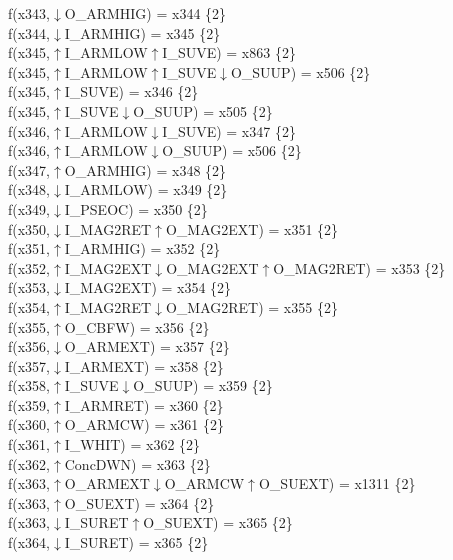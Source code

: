f(x343,$\downarrow$O\_ARMHIG) = x344 \{2\} \\  
f(x344,$\downarrow$I\_ARMHIG) = x345 \{2\} \\  
f(x345,$\uparrow$I\_ARMLOW$\uparrow$I\_SUVE) = x863 \{2\} \\  
f(x345,$\uparrow$I\_ARMLOW$\uparrow$I\_SUVE$\downarrow$O\_SUUP) = x506 \{2\} \\  
f(x345,$\uparrow$I\_SUVE) = x346 \{2\} \\  
f(x345,$\uparrow$I\_SUVE$\downarrow$O\_SUUP) = x505 \{2\} \\  
f(x346,$\uparrow$I\_ARMLOW$\downarrow$I\_SUVE) = x347 \{2\} \\  
f(x346,$\uparrow$I\_ARMLOW$\downarrow$O\_SUUP) = x506 \{2\} \\  
f(x347,$\uparrow$O\_ARMHIG) = x348 \{2\} \\  
f(x348,$\downarrow$I\_ARMLOW) = x349 \{2\} \\  
f(x349,$\downarrow$I\_PSEOC) = x350 \{2\} \\  
f(x350,$\downarrow$I\_MAG2RET$\uparrow$O\_MAG2EXT) = x351 \{2\} \\  
f(x351,$\uparrow$I\_ARMHIG) = x352 \{2\} \\  
f(x352,$\uparrow$I\_MAG2EXT$\downarrow$O\_MAG2EXT$\uparrow$O\_MAG2RET) = x353 \{2\} \\  
f(x353,$\downarrow$I\_MAG2EXT) = x354 \{2\} \\  
f(x354,$\uparrow$I\_MAG2RET$\downarrow$O\_MAG2RET) = x355 \{2\} \\  
f(x355,$\uparrow$O\_CBFW) = x356 \{2\} \\  
f(x356,$\downarrow$O\_ARMEXT) = x357 \{2\} \\  
f(x357,$\downarrow$I\_ARMEXT) = x358 \{2\} \\  
f(x358,$\uparrow$I\_SUVE$\downarrow$O\_SUUP) = x359 \{2\} \\  
f(x359,$\uparrow$I\_ARMRET) = x360 \{2\} \\  
f(x360,$\uparrow$O\_ARMCW) = x361 \{2\} \\  
f(x361,$\uparrow$I\_WHIT) = x362 \{2\} \\  
f(x362,$\uparrow$ConcDWN) = x363 \{2\} \\  
f(x363,$\uparrow$O\_ARMEXT$\downarrow$O\_ARMCW$\uparrow$O\_SUEXT) = x1311 \{2\} \\  
f(x363,$\uparrow$O\_SUEXT) = x364 \{2\} \\  
f(x363,$\downarrow$I\_SURET$\uparrow$O\_SUEXT) = x365 \{2\} \\  
f(x364,$\downarrow$I\_SURET) = x365 \{2\} \\  
